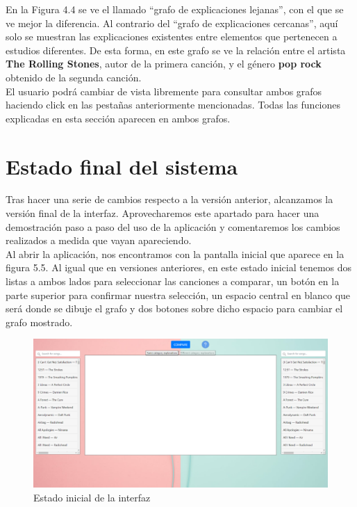En la Figura 4.4 se ve el llamado ``grafo de explicaciones lejanas'', con el que se ve mejor la diferencia. Al contrario del ``grafo de explicaciones cercanas'', aquí solo se muestran las explicaciones existentes entre elementos que pertenecen a estudios diferentes. De esta forma, en este grafo se ve la relación entre el artista \textbf{The Rolling Stones}, autor de la primera canción, y el género \textbf{pop rock} obtenido de la segunda canción.\\

El usuario podrá cambiar de vista libremente para consultar ambos grafos haciendo click en las pestañas anteriormente mencionadas. Todas las funciones explicadas en esta sección aparecen en ambos grafos.\\

\section{Estado final del sistema}

Tras hacer una serie de cambios respecto a la versión anterior, alcanzamos la versión final de la interfaz. Aprovecharemos este apartado para hacer una demostración paso a paso del uso de la aplicación y comentaremos los cambios realizados a medida que vayan apareciendo.\\

Al abrir la aplicación, nos encontramos con la pantalla inicial que aparece en la figura 5.5. Al igual que en versiones anteriores, en este estado inicial tenemos dos listas a ambos lados para seleccionar las canciones a comparar, un botón en la parte superior para confirmar nuestra selección, un espacio central en blanco que será donde se dibuje el grafo y dos botones sobre dicho espacio para cambiar el grafo mostrado.\\

\begin{figure}[h!]
	\centering
	\includegraphics[width = 1\textwidth]{Imagenes/Bitmap/Pantalla inicial.png}
	\caption{Estado inicial de la interfaz}
	\label{fig:sampleImage}
\end{figure}

